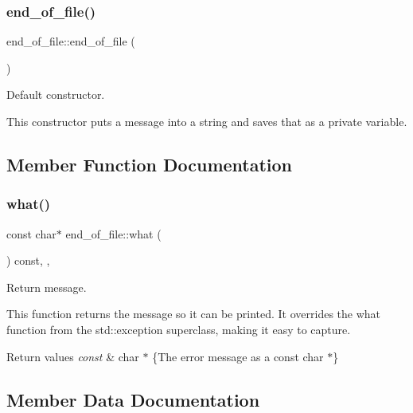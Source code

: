 \subsubsection{\texorpdfstring{end\+\_\+of\+\_\+file()}{end\_of\_file()}}
{\footnotesize\ttfamily end\+\_\+of\+\_\+file\+::end\+\_\+of\+\_\+file (\begin{DoxyParamCaption}{ }\end{DoxyParamCaption})\hspace{0.3cm}{\ttfamily [inline]}}



Default constructor. 

This constructor puts a message into a string and saves that as a private variable. 

\subsection{Member Function Documentation}
\mbox{\label{classend__of__file_a32e8c4c2f39a8484c2f39f9a98d5dfb8}} 
\subsubsection{\texorpdfstring{what()}{what()}}
{\footnotesize\ttfamily const char$\ast$ end\+\_\+of\+\_\+file\+::what (\begin{DoxyParamCaption}{ }\end{DoxyParamCaption}) const\hspace{0.3cm}{\ttfamily [inline]}, {\ttfamily [override]}, {\ttfamily [noexcept]}}



Return message. 

This function returns the message so it can be printed. It overrides the what function from the std\+::exception superclass, making it easy to capture.


\begin{DoxyRetVals}{Return values}
{\em const} & char $\ast$ \{The error message as a const char $\ast$\} \\
\hline
\end{DoxyRetVals}


\subsection{Member Data Documentation}
\mbox{\label{classend__of__file_a965eafe9e5b72fbea7621c4b16e03d99}} 
